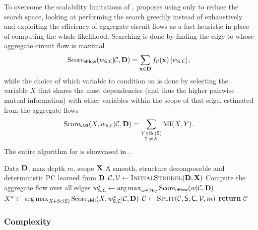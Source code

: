 To overcome the scalability limitations of ,  proposes using
only  to reduce the search space, looking at performing the search greedily instead
of exhaustively and exploiting the efficiency of aggregate circuit flows as a fast heuristic in
place of computing the whole likelihood. Searching is done by finding the edge to 
whose aggregate circuit flow is maximal
\begin{equation*}
  \operatorname{\normalfont{Score}}_{\textsf{eFlow}}(w_{\operatorname{\textsf{S}},\operatorname{\textsf{C}}}|\mathcal{C},\mathbf{D})=\sum_{\mathbf{x}\in\mathbf{D}}f_{\mathcal{C}}(\mathbf{x})\left[w_{\operatorname{\textsf{S}},\operatorname{\textsf{C}}}\right],
\end{equation*}
while the choice of which variable to condition  on is done by selecting the
variable $X$ that shares the most dependencies (and thus the higher pairwise mutual information)
with other variables within the scope of that edge, estimated from the aggregate flows
\begin{equation*}
  \operatorname{\normalfont{Score}}_{\textsf{vMI}}(X,w_{\operatorname{\textsf{S}},\operatorname{\textsf{C}}}|\mathcal{C},\mathbf{D})=\sum_{\substack{Y\in\operatorname*{\normalfont{Sc}}(\operatorname{\textsf{S}})\\Y\neq
    X}}\operatorname{\normalfont{MI}}(X,Y).
\end{equation*}
The entire algorithm for  is showcased in .

\begin{algorithm}[t]
  \caption{}\label{alg:strudel}
  \begin{algorithmic}[1]
    \Require Data $\mathbf{D}$, max depth $m$, scope $\mathbf{X}$
    \Ensure A smooth, structure decomposable and deterministic PC learned from $\mathbf{D}$
    \State $\mathcal{C},\vtree\gets\textproc{InitialStrudel}(\set{D},\set{X})$
      \State Compute the aggregate flow over all edges
      \State $w_{\operatorname{\textsf{S}},\operatorname{\textsf{C}}}^\ast\gets\operatorname*{\normalfont{arg\,max}}_{w\in\mathcal{W}_\mathcal{C}}\operatorname{\normalfont{Score}}_{\textsf{eFlow}}(w|\mathcal{C},\mathbf{D})$
      \State $X^\ast\gets\operatorname*{\normalfont{arg\,max}}_{X\in\operatorname*{\normalfont{Sc}}(\operatorname{\textsf{S}})}\operatorname{\normalfont{Score}}_{\textsf{vMI}}(X,w_{\operatorname{\textsf{S}},\operatorname{\textsf{C}}}^\ast|\mathcal{C},\mathbf{D})$
      \State $\mathcal{C}\gets\textproc{Split}(\mathcal{C},\Sum,\Child,\vtree,m)$
    \EndWhile
    \State \textbf{return} $\mathcal{C}$
  \end{algorithmic}
\end{algorithm}

\subsubsection{Complexity}

